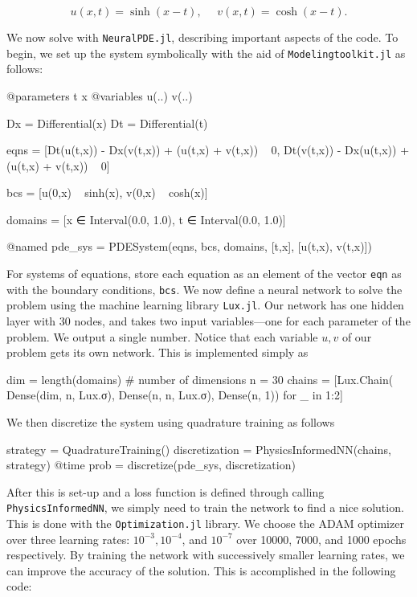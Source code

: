 \documentclass{CUP-JNL-DTM}%
\theoremstyle{definition}
\numberwithin{equation}{section}
\begin{document}
\begin{equation}
	u(x,t) = \sinh(x - t), \,\,\,\,\,\,\,\, v(x,t) = \cosh(x - t). 
\end{equation}

We now solve with \texttt{NeuralPDE.jl}, describing important aspects of the code. To begin, we set up the system symbolically with the aid of \texttt{Modelingtoolkit.jl} as follows:

\begin{jllisting}
@parameters t x
@variables u(..) v(..)

Dx = Differential(x)
Dt = Differential(t)

eqns = [Dt(u(t,x)) - Dx(v(t,x)) + (u(t,x) + v(t,x)) ~ 0,
        Dt(v(t,x)) - Dx(u(t,x)) + (u(t,x) + v(t,x)) ~ 0]

bcs = [u(0,x) ~ sinh(x), v(0,x) ~ cosh(x)]

domains = [x ∈ Interval(0.0, 1.0),
            t ∈ Interval(0.0, 1.0)]

@named pde_sys = PDESystem(eqns, bcs, domains, [t,x], [u(t,x), v(t,x)])
\end{jllisting}
For systems of equations, store each equation as an element of the vector \texttt{eqn} as with the boundary conditions, \texttt{bcs}. We now define a neural network to solve the problem using the machine learning library \texttt{Lux.jl}. Our network has one hidden layer with 30 nodes, and takes two input variables---one for each parameter of the problem. We output a single number. Notice that each variable $u,v$ of our problem gets its own network. This is implemented simply as

\begin{jllisting}
dim = length(domains) # number of dimensions
n = 30
chains = [Lux.Chain(
            Dense(dim, n, Lux.σ), 
            Dense(n, n, Lux.σ), 
            Dense(n, 1)) for _ in 1:2]
\end{jllisting}
We then discretize the system using quadrature training as follows

\begin{jllisting}
strategy = QuadratureTraining()
discretization = PhysicsInformedNN(chains, strategy)
@time prob = discretize(pde_sys, discretization)
\end{jllisting}
After this is set-up and a loss function is defined through calling \texttt{PhysicsInformedNN}, we simply need to train the network to find a nice solution. This is done with the \texttt{Optimization.jl} library. We choose the ADAM optimizer over three learning rates: $10^{-3}, 10^{-4}$, and $10^{-7}$ over 10000, 7000, and 1000 epochs respectively. By training the network with successively smaller learning rates, we can improve the accuracy of the solution. This is accomplished in the following code:
\end{document}
